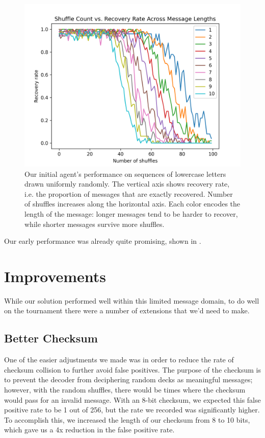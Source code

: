 \documentclass[titlepage]{article}
\begin{document}
\begin{figure}
    \centering
    \includegraphics[width=\textwidth]{figures/early_agent.png}
    \caption{Our initial agent's performance on sequences of lowercase letters drawn uniformly randomly. The vertical axis shows recovery rate, i.e. the proportion of messages that are exactly recovered. Number of shuffles increases along the horizontal axis. Each color encodes the length of the message: longer messages tend to be harder to recover, while shorter messages survive more shuffles.}
    \label{fig:early_agent}
\end{figure}

Our early performance was already quite promising, shown in .

\section{Improvements}

While our solution performed well within this limited message domain, to do well on the tournament there were a number of extensions that we'd need to make. 

\subsection{Better Checksum}
One of the easier adjustments we made was in order to reduce the rate of checksum collision to further avoid false positives. The purpose of the checksum is to prevent the decoder from deciphering random decks as meaningful messages; however, with the random shuffles, there would be times where the checksum would pass for an invalid message. With an 8-bit checksum, we expected this false positive rate to be 1 out of 256, but the rate we recorded was significantly higher. To accomplish this, we increased the length of our checksum from 8 to 10 bits, which gave us a 4x reduction in the false positive rate.
\end{document}
